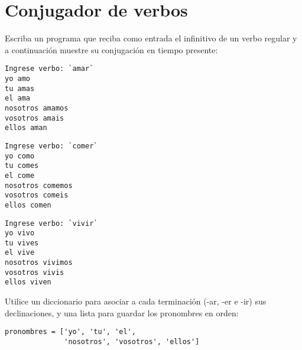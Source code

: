 \section{Conjugador de verbos}

Escriba un programa que reciba como entrada el infinitivo de un verbo
regular y a continuación muestre su conjugación en tiempo presente:

\begin{lstlisting}[language=testcase]
Ingrese verbo: `amar`
yo amo
tu amas
el ama
nosotros amamos
vosotros amais
ellos aman
\end{lstlisting}

\begin{lstlisting}[language=testcase]
Ingrese verbo: `comer`
yo como
tu comes
el come
nosotros comemos
vosotros comeis
ellos comen
\end{lstlisting}

\begin{lstlisting}[language=testcase]
Ingrese verbo: `vivir`
yo vivo
tu vives
el vive
nosotros vivimos
vosotros vivis
ellos viven
\end{lstlisting}

Utilice un diccionario para asociar a cada terminación (-ar, -er e -ir)
sus declinaciones, y una lista para guardar los pronombres en orden:
\begin{lstlisting}
pronombres = ['yo', 'tu', 'el',
              'nosotros', 'vosotros', 'ellos']
\end{lstlisting}

